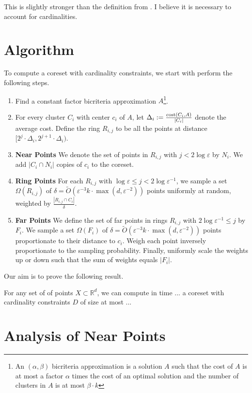 This is slightly stronger than the definition from \cite{stoc}. I believe it is necessary to account for cardinalities.

\section{Algorithm}
To compute a coreset with cardinality constraints, we start with perform the following steps.
\begin{enumerate}
    \item Find a constant factor bicriteria approximation $A$\footnote{An $(\alpha,\beta)$ bicriteria approximation is a solution $A$ such that the cost of $A$ is at most a factor $\alpha$ times the cost of an optimal solution and the number of clusters in $A$ is at most $\beta\cdot k$}.
    \item For every cluster $C_i$ with center $c_i$ of $A$, let $\Delta_i:=\frac{\text{cost}(C_i,A)}{|C_i|}$ denote the average cost. Define the ring $R_{i,j}$ to be all the points at distance $[2^j\cdot \Delta_i,2^{j+1}\cdot \Delta_i)$. 
    \item {\bf Near Points} We denote the set of points in $R_{i,j}$ with $j<2\log \varepsilon$ by $N_i$. We add $|C_i\cap N_{i}|$ copies of $c_i$ to the coreset. 
    \item {\bf Ring Points} For each $R_{i,j}$ with $\log \varepsilon \leq j <2\log \varepsilon^{-1}$, we sample a set $\Omega(R_{i,j})$ of $\delta = \tilde{O}(\varepsilon^{-3} k \cdot \max(d,\varepsilon^{-2}))$ points uniformly at random, weighted by $\frac{|R_{i,j}\cap C_i|}{\delta}$.
    \item {\bf Far Points} We define the set of far points in rings $R_{i,j}$ with $2\log \varepsilon^{-1}\leq j$ by $F_i$. We sample a set $\Omega(F_i)$ of $\delta = \tilde{O}(\varepsilon^{-3} k \cdot \max(d,\varepsilon^{-2}))$ points proportionate to their distance to $c_i$. Weigh each point inversely proportionate to the sampling probability. Finally, uniformly scale the weights up or down such that the sum of weights equals $|F_i|$. 
\end{enumerate}

Our aim is to prove the following result.
\begin{theorem}
For any set of of points $X\subset \mathbb{R}^d$, we can compute in time $...$ a coreset with cardinality constraints $D$ of size at most $...$
\end{theorem}


\section{Analysis of Near Points}

